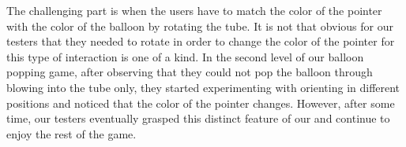 The challenging part is when the users have to match the color of the pointer with the color of the balloon by rotating the tube. It is not that obvious for our testers that they needed to rotate \tube in order to change the color of the pointer for this type of interaction is one of a kind. In the second level of our balloon popping game, after observing that they could not pop the balloon through blowing into the tube only, they started experimenting with orienting \tube in different positions and noticed that the color of the pointer changes. However, after some time, our testers eventually grasped this distinct feature of our \tube and continue to enjoy the rest of the game.


